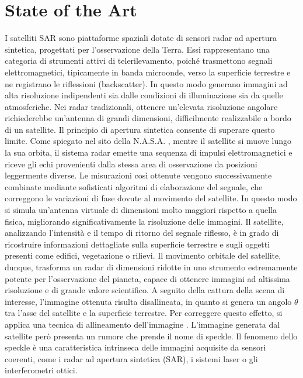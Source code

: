 \chapter{State of the Art}
I satelliti SAR sono piattaforme spaziali dotate di sensori radar ad apertura sintetica, 
progettati per l’osservazione della Terra. Essi rappresentano una categoria di strumenti attivi di telerilevamento, 
poiché trasmettono segnali elettromagnetici, tipicamente in banda microonde, verso la superficie terrestre e ne 
registrano le riflessioni (backscatter). In questo modo generano immagini ad alta risoluzione indipendenti sia 
dalle condizioni di illuminazione sia da quelle atmosferiche.
Nei radar tradizionali, ottenere un’elevata risoluzione angolare richiederebbe un’antenna di grandi dimensioni, 
difficilmente realizzabile a bordo di un satellite. Il principio di apertura sintetica consente di superare questo limite. 
Come spiegato nel sito della N.A.S.A. \cite{nasa_sar}, mentre il satellite si muove lungo la sua orbita, 
il sistema radar emette una sequenza di impulsi elettromagnetici e riceve gli echi provenienti dalla 
stessa area di osservazione da posizioni leggermente diverse.
Le misurazioni così ottenute vengono successivamente combinate mediante sofisticati algoritmi di elaborazione del segnale, 
che correggono le variazioni di fase dovute al movimento del satellite. In questo modo si simula un’antenna virtuale 
di dimensioni molto maggiori rispetto a quella fisica, migliorando significativamente la risoluzione delle immagini.
Il satellite, analizzando l’intensità e il tempo di ritorno del segnale riflesso, è in grado di ricostruire informazioni 
dettagliate sulla superficie terrestre e sugli oggetti presenti come edifici, vegetazione o rilievi. Il movimento 
orbitale del satellite, dunque, trasforma un radar di dimensioni ridotte in uno strumento estremamente potente per 
l’osservazione del pianeta, capace di ottenere immagini ad altissima risoluzione e di grande valore scientifico.
A seguito della cattura della scena di interesse, l’immagine ottenuta risulta disallineata, 
in quanto si genera un angolo $\theta$ tra l’asse del satellite e la superficie terrestre. 
Per correggere questo effetto, si applica una tecnica di allineamento dell’immagine \cite{HUGHES2020166}.
L'immagine generata dal satellite però presenta un rumore che prende il nome di speckle.   
Il fenomeno dello speckle è una caratteristica intrinseca delle immagini acquisite da sensori coerenti, 
come i radar ad apertura sintetica (SAR), i sistemi laser o gli interferometri ottici. 
